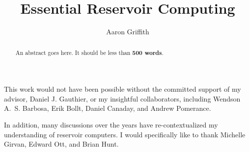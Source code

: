 \documentclass[11pt,draft,phd]{osudiss-2}
\title{Essential Reservoir Computing}
\author{Aaron Griffith}
\begin{document}
\frontmatter

\begin{abstract}
  An abstract goes here. It should be less than \textbf{500 words}.
\end{abstract}

\dedication{For my parents Gregory and Mary Lea, and my brother Nathan.}

\begin{acknowledgments}
  This work would not have been possible without the committed support
  of my advisor, Daniel J. Gauthier, or my insightful collaborators,
  including Wendson A.~S. Barbosa, Erik Bollt, Daniel Canaday, and Andrew
  Pomerance.

  In addition, many discussions over the years have
  re-contextualized my understanding of reservoir computers. I would
  specifically like to thank Michelle Girvan, Edward Ott, and Brian Hunt.
\end{acknowledgments}

\begin{vita}

  \begin{publist}
  \end{publist}

  \begin{fieldsstudy}
  \end{fieldsstudy}
\end{vita}

\tableofcontents 

\clearpage
\listoffigures 

\clearpage
\listoftables 


\mainmatter







\backmatter
\nocite{*} %


\appendix

\end{document}
